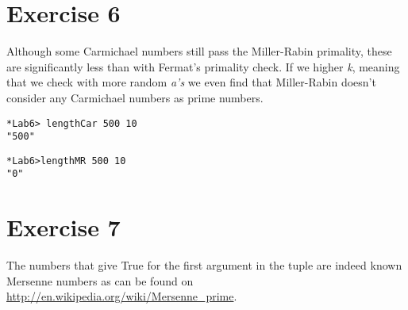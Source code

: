 \documentclass{article}
\begin{document}
\section*{Exercise 6}


Although some Carmichael numbers still pass the Miller-Rabin primality, these are significantly less than with Fermat's primality check. If we higher \emph{k}, meaning that we check with more random \emph{a's} we even find that Miller-Rabin doesn't consider any Carmichael numbers as prime numbers.


\begin{verbatim}
*Lab6> lengthCar 500 10
"500"
\end{verbatim}

\begin{verbatim}
*Lab6>lengthMR 500 10
"0"
\end{verbatim}

\section*{Exercise 7}


The numbers that give True for the first argument in the tuple are indeed known Mersenne numbers as can be found on \url{http://en.wikipedia.org/wiki/Mersenne_prime}.
\end{document}

